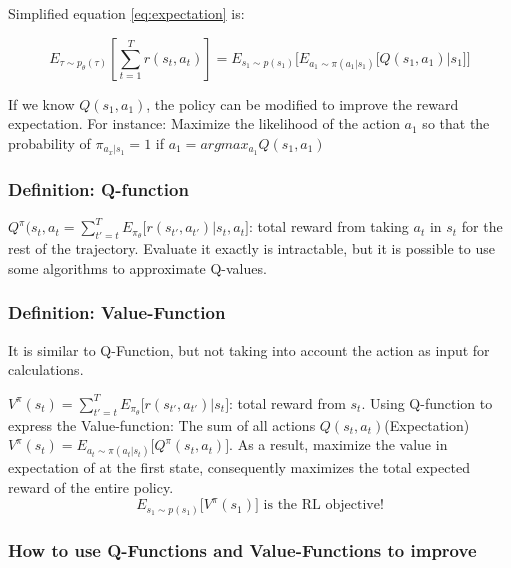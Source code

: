 \documentclass[]{article}
\begin{document}
\par Simplified equation \eqref{eq:expectation} is:

\begin{equation}
    \mathit{E}_{\tau \sim p_{\theta}(\tau)}\left [ \sum_{t=1}^{T}r(s_{t},a_{t}) \right]  = \mathit{E}_{s_{1} \sim
    p(s_{1})} \big[ \mathit{E}_{a_{1} \sim \pi(a_{1}|s_{1})} \big[Q(s_{1},a_{1})|s_{1}\big]\big]
\end{equation}

If we know $Q(s_{1},a_{1})$, the policy can be modified to improve the reward expectation. For instance: Maximize the
likelihood of the action $a_{1}$ so that the probability of $\pi_{a_{x}|s_{1}} = 1$ if $a_{1} = argmax_{a_{1}} Q(s_{1},a_{1})$

\subsubsection*{Definition: Q-function}
\label{sub:Definition: Q-function}

$Q^{\pi}(s_{t},a_{t} = \sum_{t'=t}^{T} \mathit{E}_{\pi_{\theta}} \big[r(s_{t'},a_{t'})|s_{t},a_{t} \big]$: total reward
from taking $a_{t}$ in $s_{t}$ for the rest of the trajectory. Evaluate it  exactly is intractable, but it is possible to
use some algorithms to approximate Q-values. 

\subsubsection*{Definition: Value-Function}
\label{sub:Definition: Value-function}

It is similar to Q-Function, but not taking into account the action as input for calculations.

$V^{\pi}(s_{t}) = \sum_{t'=t}^{T} \mathit{E}_{\pi_{\theta}} \big[r(s_{t'},a_{t'})|s_{t} \big]$: total reward from
$s_{t}$. Using Q-function to express the Value-function: The sum of all actions  $Q(s_{t},a_{t})$(Expectation)
$V^{\pi}(s_{t}) = \mathit{E}_{a_{t} \sim \pi(a_{t}|s_{t})} \big[Q^{\pi}(s_{t},a_{t})\big]$. As a result, maximize the value in expectation of
at the first state, consequently maximizes the total expected reward of the entire policy. 
\begin{equation}
    \mathit{E}_{s_{1} \sim p(s_{1})}\big[V^{\pi}(s_{1})] \text{ is the RL objective!}
\end{equation}

\subsubsection*{How to use Q-Functions and Value-Functions to improve}
\label{sub:How to use Q-Functions and Value-Functions}
\end{document}
